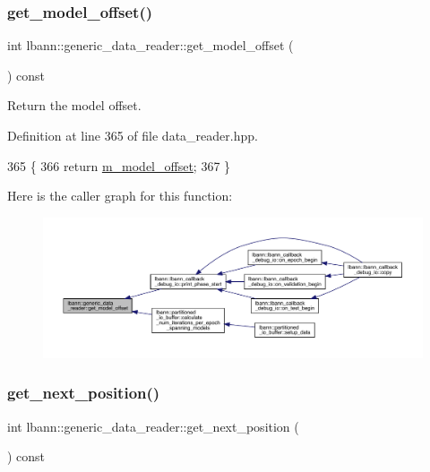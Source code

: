 \subsubsection{\texorpdfstring{get\+\_\+model\+\_\+offset()}{get\_model\_offset()}}
{\footnotesize\ttfamily int lbann\+::generic\+\_\+data\+\_\+reader\+::get\+\_\+model\+\_\+offset (\begin{DoxyParamCaption}{ }\end{DoxyParamCaption}) const\hspace{0.3cm}{\ttfamily [inline]}}



Return the model offset. 



Definition at line 365 of file data\+\_\+reader.\+hpp.


\begin{DoxyCode}
365                                \{
366     \textcolor{keywordflow}{return} \hyperlink{classlbann_1_1generic__data__reader_a5d9a0efd1ebe43a74911c35ffe84edc9}{m\_model\_offset};
367   \}
\end{DoxyCode}
Here is the caller graph for this function\+:\nopagebreak
\begin{figure}[H]
\begin{center}
\leavevmode
\includegraphics[width=350pt]{classlbann_1_1generic__data__reader_a9e78b6062be9746c81eabf0f9d28264e_icgraph}
\end{center}
\end{figure}
\mbox{\label{classlbann_1_1generic__data__reader_ab11a9eca77ac9018bdab45ead7ef5e13}} 
\subsubsection{\texorpdfstring{get\+\_\+next\+\_\+position()}{get\_next\_position()}}
{\footnotesize\ttfamily int lbann\+::generic\+\_\+data\+\_\+reader\+::get\+\_\+next\+\_\+position (\begin{DoxyParamCaption}{ }\end{DoxyParamCaption}) const}



